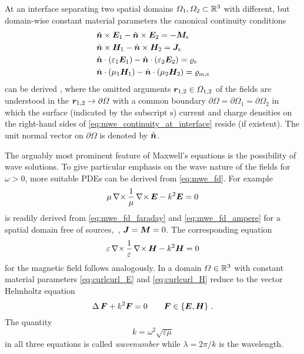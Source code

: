 At an interface separating two spatial domains $\Omega_1, \Omega_2 \subset \mathbb{R}^3$
with different, but domain-wise constant material parameters the canonical
continuity conditions
\begin{subequations}\label{eq:mwe_continuity_at_interface}
	\begin{align}
		&\uv{n} \times \pvec{E}_1 - \uv{n} \times \pvec{E}_2 =
		- \pvec{M}_\mathrm{s} \\
		&\uv{n} \times \pvec{H}_1 - \uv{n} \times \pvec{H}_2 =
		\pvec{J}_\mathrm{s} \\
		&\uv{n} \cdot \left(\varepsilon_1 \pvec{E}_1\right) -
		\uv{n} \cdot \left(\varepsilon_2 \pvec{E}_2\right) = 
		\varrho_\mathrm{s} \\
		&\uv{n} \cdot \left(\mu_1 \pvec{H}_1\right) -
		\uv{n} \cdot \left(\mu_2 \pvec{H}_2\right) = 
		\varrho_\mathrm{m,s}
	\end{align}
\end{subequations}
can be derived \cite[p20]{Jackson2013}, where the omitted arguments
$\robs_{1,2} \in \Omega_{1,2}$ of the fields are understood in the
$\robs_{1,2} \to \partial \Omega$ with a common boundary
$\partial \Omega = \partial \Omega_1 = \partial \Omega_2$ in which the 
surface (indicated by the subscript $\mathrm{s}$) current and charge
densities on the right-hand sides of \eqref{eq:mwe_continuity_at_interface}
reside (if existent).
The unit normal vector on $\partial \Omega$ is denoted by $\uv{n}$.

The arguably most prominent feature of Maxwell's equations is the possibility
of wave solutions.
To give particular emphasis on the wave nature of the fields for $\omega > 0$,
more suitable \acp{PDE} can be derived from \eqref{eq:mwe_fd}.
For example
\begin{equation}\label{eq:curlcurl_E}
	\mu\curl\frac{1}{\mu}\curl\pvec{E} - k^2\pvec{E} = 0 
\end{equation}
is readily derived from \eqref{eq:mwe_fd_faraday} and \eqref{eq:mwe_fd_ampere}
for a spatial domain free of sources,~\ie, $\pvec{J} = \pvec{M} = 0$.
The corresponding equation
\begin{equation}\label{eq:curlcurl_H}
	\varepsilon\curl\frac{1}{\varepsilon}\curl\pvec{H} - k^2\pvec{H} = 0
\end{equation}
for the magnetic field follows analogously.
In a domain $\Omega \in \mathbb{R}^3$ with constant material parameters
\eqref{eq:curlcurl_E} and \eqref{eq:curlcurl_H} reduce to the vector Helmholtz
equation
\begin{equation}\label{eq:vector_helmholtz_equation}
	\laplace \pvec{F} + k^2 \pvec{F} = 0 \qquad
	\pvec{F} \in \left\{\pvec{E}, \pvec{H}\right\}
	\, .
\end{equation}
The quantity
\begin{equation}\label{eq:wavenumber}
	k = \omega^2 \sqrt{\varepsilon \mu}
\end{equation}
in all three equations is called \emph{wavenumber} while $\lambda = 2\pi / k$
is the wavelength.

